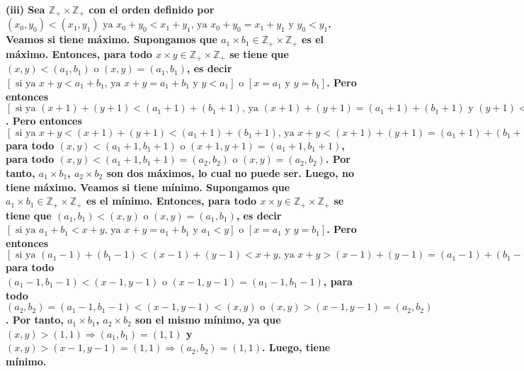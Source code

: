 \documentclass{article}
\begin{document}
\bf (iii) \rm  Sea \(\mathbb{Z}_{+}\times \mathbb{Z}_{+}\) con el orden definido por \((x_0,y_0)<(x_1,y_1) \text{ ya } x_0+y_0<x_1+y_1\text{, ya } x_0+y_0=x_1+y_1 \text{ y } y_0<y_1\). Veamos si tiene máximo. Supongamos que \(a_1\times b_1 \in \mathbb{Z}_{+} \times \mathbb{Z}_{+} \) es el máximo. Entonces, para todo \(x\times y\in \mathbb{Z}_{+}\times \mathbb{Z}_{+}\) se tiene que \((x,y)<(a_1,b_1) \text{ o } (x,y)=(a_1,b_1)\), es decir  \([\text{ si ya } x+y<a_1+b_1\text{, ya } x+y=a_1+b_1 \text{ y } y<a_1] \text{ o } [x=a_1 \text{ y } y=b_1]\). Pero entonces \([\text{ si ya } (x+1)+(y+1)<(a_1+1)+(b_1+1)\text{, ya } (x+1)+(y+1)=(a_1+1)+(b_1+1) \text{ y } (y+1)<(a_1+1)] \text{ o } [(x+1)=(a_1+1) \text{ y } (y+1)=(b_1+1)]\). Pero entonces \([\text{ si ya } x+y<(x+1)+(y+1)<(a_1+1)+(b_1+1)\text{, ya } x+y<(x+1)+(y+1)=(a_1+1)+(b_1+1) \text{ y } y<(y+1)<(a_1+1)] \text{ o } [x<(x+1)=(a_1+1) \text{ y } y<(y+1)=(b_1+1)]\) para todo \((x,y)<(a_1+1,b_1+1) \text{ o } (x+1,y+1)=(a_1+1,b_1+1)\), para todo \((x,y)<(a_1+1,b_1+1)=(a_2,b_2) \text{ o } (x,y)=(a_2,b_2)\). Por tanto, \(a_1 \times b_1\), \(a_2\times b_2\) son dos máximos, lo cual no puede ser. Luego, no tiene máximo. Veamos si tiene mínimo. Supongamos que \(a_1\times b_1 \in \mathbb{Z}_{+} \times \mathbb{Z}_{+} \) es el mínimo. Entonces, para todo \(x\times y\in \mathbb{Z}_{+}\times \mathbb{Z}_{+}\) se tiene que \((a_1,b_1)<(x,y) \text{ o } (x,y)=(a_1,b_1)\), es decir  \([\text{ si ya } a_1+b_1<x+y\text{, ya } x+y=a_1+b_1 \text{ y } a_1<y] \text{ o } [x=a_1 \text{ y } y=b_1]\). Pero entonces \([\text{ si ya } (a_1-1)+(b_1-1)<(x-1)+(y-1)<x+y\text{, ya } x+y >(x-1)+(y-1)=(a_1-1)+(b_1-1) \text{ y } (a_1-1)<(y-1)<y] \text{ o } [x>(x-1)=(a_1-1) \text{ y } y>(y-1)=(b_1-1)]\) para todo \((a_1-1,b_1-1)<(x-1,y-1) \text{ o } (x-1,y-1)=(a_1-1,b_1-1)\), para todo \((a_2,b_2)=(a_1-1,b_1-1)<(x-1,y-1)<(x,y)\text{ o } (x,y)> (x-1,y-1)=(a_2,b_2)\). Por tanto, \(a_1 \times b_1\), \(a_2\times b_2\) son el mismo mínimo, ya que \((x,y)>(1,1)\Rightarrow (a_1,b_1)=(1,1)\) y \((x,y)>(x-1,y-1)=(1,1)\Rightarrow (a_2,b_2)=(1,1)\). Luego, tiene mínimo.
\end{document}
